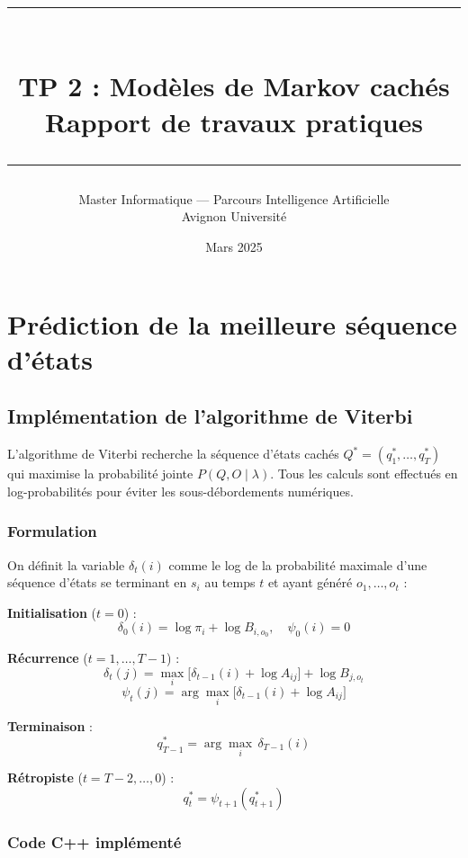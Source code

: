 \documentclass[12pt,a4paper]{article}
\title{
  \vspace{-1cm}
  \rule{\linewidth}{1.5pt}\\[0.4cm]
  {\LARGE \textbf{TP 2 : Modèles de Markov cachés}}\\[0.3cm]
  {\large Rapport de travaux pratiques}\\[0.2cm]
  \rule{\linewidth}{1pt}
}
\author{Master Informatique --- Parcours Intelligence Artificielle\\
        Avignon Université}
\date{Mars 2025}
\begin{document}
\maketitle
\thispagestyle{empty}
\tableofcontents
\newpage

\section{Prédiction de la meilleure séquence d'états}

\subsection{Implémentation de l'algorithme de Viterbi}

L'algorithme de Viterbi recherche la séquence d'états cachés $Q^* = (q_1^*, \ldots, q_T^*)$
qui maximise la probabilité jointe $P(Q, O \mid \lambda)$. Tous les calculs sont effectués
en log-probabilités pour éviter les sous-débordements numériques.

\subsubsection*{Formulation}

On définit la variable $\delta_t(i)$ comme le log de la probabilité maximale d'une
séquence d'états se terminant en $s_i$ au temps $t$ et ayant généré $o_1, \ldots, o_t$ :

\begin{formulebox}
\textbf{Initialisation} ($t = 0$) :
\[
  \delta_0(i) = \log \pi_i + \log B_{i,o_0}, \quad \psi_0(i) = 0
\]

\textbf{Récurrence} ($t = 1, \ldots, T-1$) :
\[
  \delta_t(j) = \max_{i}\bigl[\delta_{t-1}(i) + \log A_{ij}\bigr] + \log B_{j,o_t}
\]
\[
  \psi_t(j) = \arg\max_{i}\bigl[\delta_{t-1}(i) + \log A_{ij}\bigr]
\]

\textbf{Terminaison} :
\[
  q^*_{T-1} = \arg\max_{i}\, \delta_{T-1}(i)
\]

\textbf{Rétropiste} ($t = T-2, \ldots, 0$) :
\[
  q^*_t = \psi_{t+1}(q^*_{t+1})
\]
\end{formulebox}

\subsubsection*{Code C++ implémenté}
\end{document}
